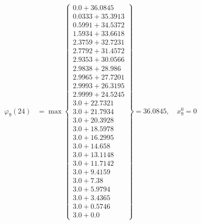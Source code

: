 \documentclass{article}
\begin{document}
\begin{align*}
  
\varphi_{9}(24) &= \max \left\{ \begin{array}{c}
0.0 + 36.0845 \\
 0.0333 + 35.3913 \\
 0.5991 + 34.5372 \\
 1.5934 + 33.6618 \\
 2.3759 + 32.7231 \\
 2.7792 + 31.4572 \\
 2.9353 + 30.0566 \\
 2.9838 + 28.986 \\
 2.9965 + 27.7201 \\
 2.9993 + 26.3195 \\
 2.9999 + 24.5245 \\
 3.0 + 22.7321 \\
 3.0 + 21.7934 \\
 3.0 + 20.3928 \\
 3.0 + 18.5978 \\
 3.0 + 16.2995 \\
 3.0 + 14.658 \\
 3.0 + 13.1148 \\
 3.0 + 11.7142 \\
 3.0 + 9.4159 \\
 3.0 + 7.38 \\
 3.0 + 5.9794 \\
 3.0 + 3.4365 \\
 3.0 + 0.5746 \\
 3.0 + 0.0
\end{array} \right\}=36.0845,\quad x_{9}^0=0\\
  
  
  

\end{align*}
\end{document}

